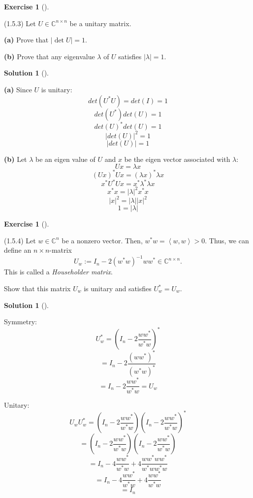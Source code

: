\documentclass[numbers=enddot,12pt,final,onecolumn,notitlepage]{scrartcl}
\newcounter{exer}
\newcounter{sol}
\theoremstyle{definition}
\newtheorem{exmp}[exer]{Exercise}
\newenvironment{exercise}[1][]
{\begin{exmp}[#1]\begin{leftbar}}
        {\end{leftbar}\end{exmp}}
\newtheorem{solu}[sol]{Solution}
\newenvironment{solution}[1][]
{\begin{solu}[#1]\begin{leftbar}}
        {\end{leftbar}\end{solu}}
\begin{document}
\begin{exercise}
	\label{exe.unitary.det-eval} (1.5.3) Let $U\in\mathbb{C}^{n\times n}$ be a
	unitary matrix.

	\textbf{(a)} Prove that $\left\vert \det U\right\vert =1$.

	\textbf{(b)} Prove that any eigenvalue $\lambda$ of $U$ satisfies $\left\vert
		\lambda\right\vert =1$.
\end{exercise}

\begin{solution}
	\textbf{(a)} Since $U$ is unitary:
	\[
		det(U^{\ast}U) = det(I) = 1
	\]
	\[
		det(U^{\ast})det(U) = 1
	\]
	\[
		det(U)^{\ast}det(U) = 1
	\]
	\[
		\vert det(U) \vert ^2 = 1
	\]
	\[
		\vert det(U) \vert = 1
	\]

	\textbf{(b)} Let $\lambda$ be an eigen value of $U$ and $x$ be the eigen vector associated with $\lambda$:
	\[
		Ux = \lambda x
	\]
	\[
		(Ux)^{\ast} Ux = (\lambda x)^{\ast} \lambda x
	\]
	\[
		x^{\ast}U^{\ast}Ux = x^{\ast}\lambda^{\ast} \lambda x
	\]
	\[
		x^{\ast}x = \vert \lambda \vert ^{2} x^{\ast}x
	\]
	\[
		\vert x \vert ^2 = \vert \lambda \vert \vert x \vert ^2
	\]
	\[
		1 = \vert \lambda \vert
	\]
\end{solution}

\begin{exercise}
	\label{exe.unitary.house} (1.5.4) Let $w\in\mathbb{C}^{n}$ be a nonzero
	vector. Then, $w^{\ast}w=\left\langle w,w\right\rangle >0$. Thus, we can define an
	$n\times n$-matrix
	\[
		U_{w}:=I_{n}-2\left(  w^{\ast}w\right)  ^{-1}ww^{\ast}\in\mathbb{C}^{n\times
			n}.
	\]
	This is called a \emph{Householder matrix}.

	Show that this matrix $U_{w}$ is unitary and satisfies $U_{w}^{\ast}=U_{w}$.
\end{exercise}

\begin{solution}
	Symmetry: \\
	\[
		U_w^{\ast} = (I_n - 2\frac{ww^{\ast}}{w^{\ast}w})^{\ast}
	\]
	\[
		= I_n - 2\frac{(ww^{\ast})^{\ast}}{(w^{\ast}w)^{\ast}}
	\]
	\[
		= I_n - 2\frac{ww^{\ast}}{w^{\ast}w} = U_w
	\]

	Unitary: \\
	\[
		U_wU_w^{\ast} = (I_n - 2\frac{ww^{\ast}}{w^{\ast}w})(I_n - 2\frac{ww^{\ast}}{w^{\ast}w})^{\ast}
	\]
	\[
		= (I_n - 2\frac{ww^{\ast}}{w^{\ast}w})(I_n - 2\frac{ww^{\ast}}{w^{\ast}w})
	\]
	\[
		= I_n - 4\frac{ww^{\ast}}{w^{\ast}w} + 4\frac{ww^{\ast}ww^{\ast}}{w^{\ast}ww^{\ast}w}
	\]
	\[
		= I_n - 4\frac{ww^{\ast}}{w^{\ast}w} + 4\frac{ww^{\ast}}{w^{\ast}w}
	\]
	\[
		= I_n
	\]
\end{solution}
\end{document}
